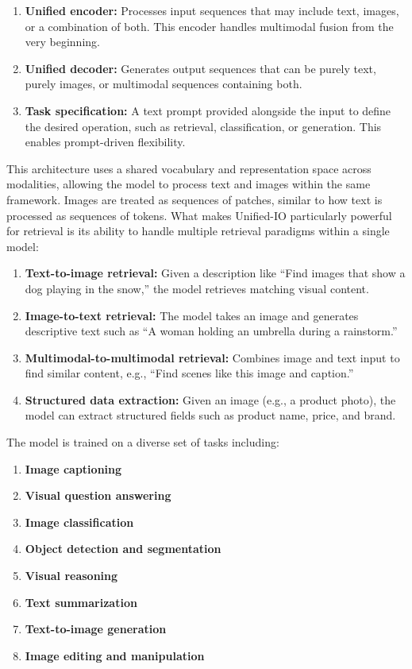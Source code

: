 \documentclass[conference]{IEEEtran}
\begin{document}
\begin{enumerate}
\begin{enumerate}
    \item \textbf{Unified encoder:} Processes input sequences that may include text, images, or a combination of both. This encoder handles multimodal fusion from the very beginning.
    
    \item \textbf{Unified decoder:} Generates output sequences that can be purely text, purely images, or multimodal sequences containing both.
    
    \item \textbf{Task specification:} A text prompt provided alongside the input to define the desired operation, such as retrieval, classification, or generation. This enables prompt-driven flexibility.
\end{enumerate}

This architecture uses a shared vocabulary and representation space across modalities, allowing the model to process text and images within the same framework. Images are treated as sequences of patches, similar to how text is processed as sequences of tokens.
What makes Unified-IO particularly powerful for retrieval is its ability to handle multiple retrieval paradigms within a single model:

\begin{enumerate}
    \item \textbf{Text-to-image retrieval:} Given a description like “Find images that show a dog playing in the snow,” the model retrieves matching visual content.
    
    \item \textbf{Image-to-text retrieval:} The model takes an image and generates descriptive text such as “A woman holding an umbrella during a rainstorm.”
    
    \item \textbf{Multimodal-to-multimodal retrieval:} Combines image and text input to find similar content, e.g., “Find scenes like this image and caption.”
    
    \item \textbf{Structured data extraction:} Given an image (e.g., a product photo), the model can extract structured fields such as product name, price, and brand.
\end{enumerate}

The model is trained on a diverse set of tasks including:

\begin{enumerate}
    \item \textbf{Image captioning}
    \item \textbf{Visual question answering}
    \item \textbf{Image classification}
    \item \textbf{Object detection and segmentation}
    \item \textbf{Visual reasoning}
    \item \textbf{Text summarization}
    \item \textbf{Text-to-image generation}
    \item \textbf{Image editing and manipulation}
\end{enumerate}


\end{enumerate}
\end{document}
